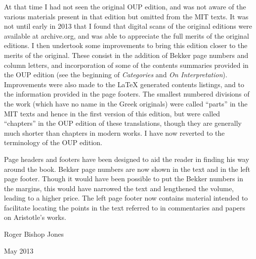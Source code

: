 At that time I had not seen the original OUP edition, and was not aware of the various materials present in that edition but omitted from the MIT texts.
It was not until early in 2013 that I found that digital scans of the original editions were available at archive.org, and was able to appreciate the full merits of the original editions.
I then undertook some improvements to bring this edition closer to the merits of the original.
These consist in the addition of Bekker page numbers and column letters, and incorporation of some of the contents summaries provided in the OUP edition (see the beginning of \emph{Categories} and \emph{On Interpretation}).
Improvements were also made to the {\LaTeX} generated contents listings, and to the information provided in the page footers.
The smallest numbered divisions of the work (which have no name in the Greek originals) were called ``parts'' in the MIT texts and hence in the first version of this edition, but were called ``chapters'' in the OUP edition of these translations, though they are generally much shorter than chapters in modern works.
I have now reverted to the terminology of the OUP edition.

Page headers and footers have been designed to aid the reader in finding his way around the book.
Bekker page numbers are now shown in the text and in the left page footer.
Though it would have been possible to put the Bekker numbers in the margins, this would have narrowed the text and lengthened the volume, leading to a higher price.
The left page footer now contains material intended to facilitate locating the points in the text referred to in commentaries and papers on Aristotle's works.

\vspace{0.2in}

Roger Bishop Jones

May 2013

\vfill

\mainmatter

\renewcommand{\aref}{\arefC}



\backmatter

%
%




\renewcommand{\aref}{}
\renewcommand{\RbJsref}{}
\renewcommand{\volumename}{}
\renewcommand{\chaptermark}[1]{}
\renewcommand{\sectionmark}[1]{}

\printindex

\vfil



